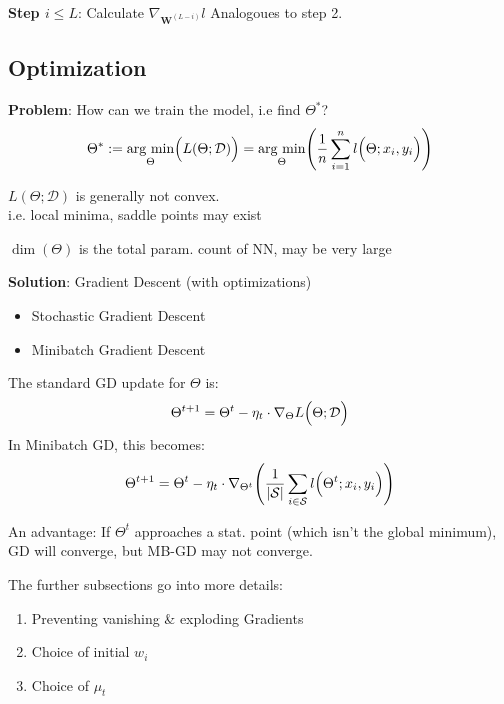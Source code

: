 \textbf{Step $i \leq L$}: Calculate $\nabla_{\textbf{W}^{(L-i)}}l$ Analogoues to step 2.\\

\newpage

\subsection{Optimization}

\textbf{Problem}: How can we train the model, i.e find $\Theta^*$?
$$
    \Theta^* := \underset{\Theta}{\text{arg min}}\Bigl( L(\Theta; \mathcal{D}) \Bigr) = \underset{\Theta}{\text{arg min}} \Biggl( \frac{1}{n} \sum_{i=1}^{n} l\Bigl( \Theta;x_i,y_i \Bigr) \Biggr)
$$

{\footnotesize
    \remark $L(\Theta;\mathcal{D})$ is generally not convex.\\
    {\color{gray}
        i.e. local minima, saddle points may exist
    }

    \remark $\dim(\Theta)$ is the total param. count of NN, may be very large
}

\textbf{Solution}: Gradient Descent (with optimizations)
\begin{itemize}
    \item Stochastic Gradient Descent\\
    \item Minibatch Gradient Descent\\
\end{itemize}

The standard GD update for $\Theta$ is:
$$
    \Theta^{t+1} = \Theta^t - \eta_t\cdot\nabla_\Theta L\Bigl( \Theta;\mathcal{D} \Bigr)
$$
In Minibatch GD, this becomes:\\
$$
    \Theta^{t+1} = \Theta^t - \eta_t\cdot\nabla_{\Theta^t} \Biggl( \frac{1}{|\mathcal{S}|}\sum_{i\in \mathcal{S}} l\Bigl( \Theta^t; x_i,y_i \Bigr) \Biggr)
$$

{\footnotesize
    \remark An advantage: If $\Theta^t$ approaches a stat. point (which isn't the global minimum), GD will converge, but MB-GD may not converge.
}

The further subsections go into more details:
\begin{enumerate}
    \item Preventing vanishing \& exploding Gradients
    \item Choice of initial $w_i$
    \item Choice of $\mu_t$
\end{enumerate}

